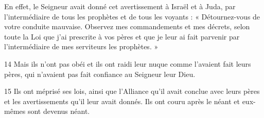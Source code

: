 En effet, le Seigneur avait donné cet avertissement à Israël et à Juda, par l’intermédiaire de tous les prophètes et de tous les voyants : « Détournez-vous de votre conduite mauvaise. Observez mes commandements et mes décrets, selon toute la Loi que j’ai prescrite à vos pères et que je leur ai fait parvenir par l’intermédiaire de mes serviteurs les prophètes. »

14 Mais ils n’ont pas obéi et ils ont raidi leur nuque comme l’avaient fait leurs pères, qui n’avaient pas fait confiance au Seigneur leur Dieu.

15 Ils ont méprisé ses lois, ainsi que l’Alliance qu’il avait conclue avec leurs pères et les avertissements qu’il leur avait donnés. Ils ont couru après le néant et eux-mêmes sont devenus néant.